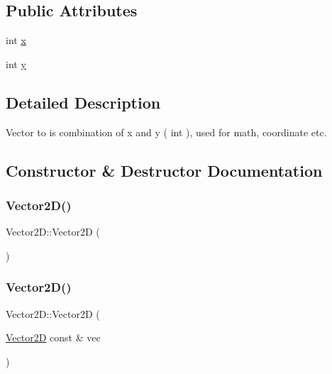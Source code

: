\subsection*{Public Attributes}
\begin{DoxyCompactItemize}
\item 
int \mbox{\hyperlink{classsc_1_1_vector2_d_aa7b06387b89f15a07dfcd5ad401b021e}{x}}
\item 
int \mbox{\hyperlink{classsc_1_1_vector2_d_ac1c2d0950e1e5903f8032cfb327ca1b1}{y}}
\end{DoxyCompactItemize}


\subsection{Detailed Description}
Vector to is combination of x and y ( int ), used for math, coordinate etc. 

\subsection{Constructor \& Destructor Documentation}
\mbox{\label{classsc_1_1_vector2_d_a98e9997ebb7a629f4db52397d4e0d653}} 
\subsubsection{\texorpdfstring{Vector2D()}{Vector2D()}\hspace{0.1cm}{\footnotesize\ttfamily [1/5]}}
{\footnotesize\ttfamily Vector2\+D\+::\+Vector2D (\begin{DoxyParamCaption}{ }\end{DoxyParamCaption})}

\mbox{\label{classsc_1_1_vector2_d_a6be27d00722f8899b4f205010b0a17e7}} 
\subsubsection{\texorpdfstring{Vector2D()}{Vector2D()}\hspace{0.1cm}{\footnotesize\ttfamily [2/5]}}
{\footnotesize\ttfamily Vector2\+D\+::\+Vector2D (\begin{DoxyParamCaption}\item[{\mbox{\hyperlink{classsc_1_1_vector2_d}{Vector2D}} const \&}]{vec }\end{DoxyParamCaption})}

